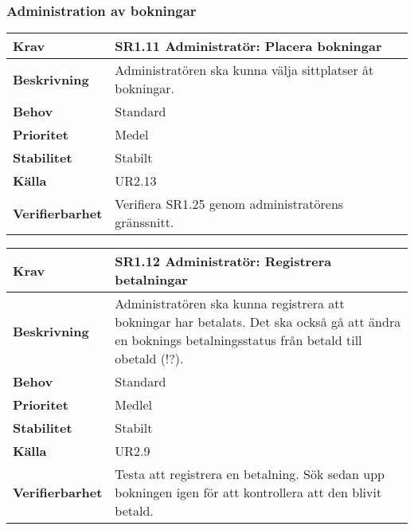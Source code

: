 \documentclass[a4paper, twoside, 11pt, titlepage]{article}
\begin{document}
		\subsubsection{Administration av bokningar}


		\begin{tabular} { p{2.6cm} p{12.5cm} }
			\hline
			\sffamily\textbf{Krav} & \sffamily\textbf{SR1.11 Administratör: Placera bokningar } \\
			\hline
			\sffamily\textbf{Beskrivning} & Administratören ska kunna välja sittplatser åt bokningar.  \\
			\hline
			\sffamily\textbf{Behov} & Standard  \\
			\hline
			\sffamily\textbf{Prioritet} & Medel  \\
			\hline
			\sffamily\textbf{Stabilitet} & Stabilt  \\
			\hline
			\sffamily\textbf{Källa} & UR2.13  \\
			\hline
			\sffamily\textbf{Verifierbarhet} & Verifiera SR1.25 genom administratörens gränssnitt.  \\
			\hline
		\end{tabular}
		\vspace{6mm}

		\begin{tabular} { p{2.6cm} p{12.5cm} }
			\hline
			\sffamily\textbf{Krav} & \sffamily\textbf{SR1.12 Administratör: Registrera betalningar } \\
			\hline
			\sffamily\textbf{Beskrivning} & Administratören ska kunna registrera att bokningar har betalats. Det ska också gå att ändra en boknings betalningsstatus från betald till obetald (!?).  \\
			\hline
			\sffamily\textbf{Behov} & Standard  \\
			\hline
			\sffamily\textbf{Prioritet} & Medlel  \\
			\hline
			\sffamily\textbf{Stabilitet} & Stabilt  \\
			\hline
			\sffamily\textbf{Källa} & UR2.9  \\
			\hline
			\sffamily\textbf{Verifierbarhet} & Testa att registrera en betalning. Sök sedan upp bokningen igen för att kontrollera att den blivit betald.  \\
			\hline
		\end{tabular}
		\vspace{6mm}
\end{document}
